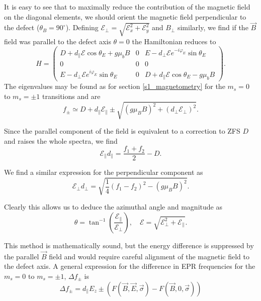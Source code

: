 It is easy to see that to maximally reduce the contribution of the magnetic field on the diagonal elements, we should orient the magnetic field perpendicular to the defect ($\theta_B = 90^\circ$). Defining $\mathcal{E}_\perp = \sqrt{\mathcal{E}_x^2 + \mathcal{E}_y^2}$ and $B_\perp$ similarly, we find if the $\vec{B}$ field was parallel to the defect axis $\theta = 0$ the Hamiltonian reduces to \begin{equation}
	H = \begin{pmatrix}
		D + d_\parallel \mathcal{E}\cos\theta_E + g\mu_b B & 0 & E - d_\perp \mathcal{E} e^{-i \varphi_E}\sin\theta_E \\
		0                                                  & 0 & 0                                                    \\
		E - d_\perp\mathcal{E}e^{i \varphi_E}\sin\theta_E  & 0 & D+ d_\parallel \mathcal{E}\cos\theta_E - g\mu_b B
	\end{pmatrix}.
	\label{eq:}
\end{equation}
The eigenvalues may be found as for section \ref{s1_magnetometry} for the $m_s = 0$ to $m_s = \pm 1$ transitions and are
\begin{equation}
	f_{\pm} \simeq D + d_\parallel \mathcal{E}_\parallel\pm \sqrt{(g \mu_B B)^2 + (d_\perp\mathcal{E}_\perp)^2  }.
	\label{eq:}
\end{equation}

Since the parallel component of the field is equivalent to a correction to ZFS $D$ and raises the whole spectra, we find
\begin{equation}
	\mathcal{E}_\parallel d_\parallel = \frac{f_1 + f_2}{2} - D.
	\label{eq:}
\end{equation}

We find a similar expression for the perpendicular component as
\begin{equation}
	\mathcal{E}_\perp d_\perp = \sqrt{\frac{1}{4}(f_1 - f_2)^2 -(g \mu_B B)^2}.
	\label{eq:s1_elect_perp}
\end{equation}

Clearly this allows us to deduce the azimuthal angle and magnitude as
\begin{equation}
    \theta = \tan^{-1} \left(\frac{\mathcal{E}_\parallel}{\mathcal{E}_\perp}\right), \quad \mathcal{E} = \sqrt{\mathcal{E}_\perp^2 + \mathcal{E}_\parallel}.
	\label{eq:angle_magnitude_s1_electro}
\end{equation}


This method is mathematically sound, but the energy difference is suppressed by the parallel $\vec{B}$ field and would require careful alignment of the magnetic field to the defect axis.
A general expression for the difference in EPR frequencies for the $m_s = 0$ to $m_s = \pm1$, $\Delta f_\pm$ is \cite{Dolde2011}
\begin{equation}
	\Delta f _\pm = d_\parallel E_z \pm \left(F(\vec{B},\vec{E},\vec{\sigma}) - F(\vec{B},0,\vec{\sigma})\right)
	\label{eq:s1_electro_freq_diff}
\end{equation}

